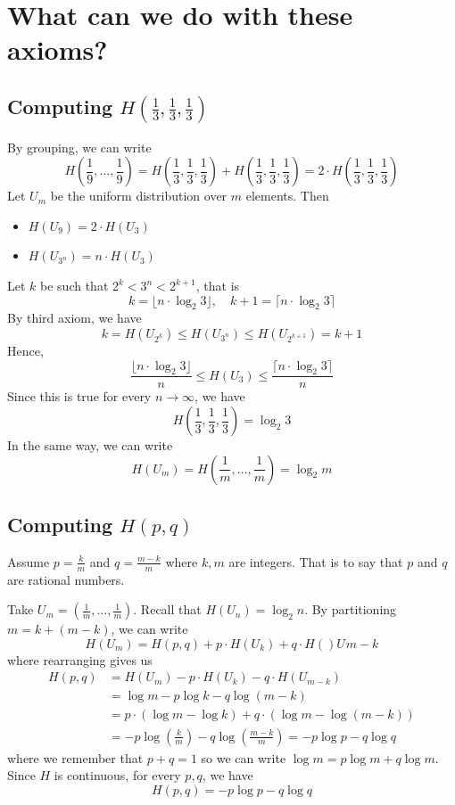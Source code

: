 \documentclass{article}
\begin{document}
\section{What can we do with these axioms?}

\subsection{Computing $H\left(\frac{1}{3},\frac{1}{3},\frac{1}{3}\right)$}

By grouping, we can write 
\[
H\left(\frac{1}{9},\ldots,\frac{1}{9}\right)=H\left(\frac{1}{3},\frac{1}{3},\frac{1}{3}\right)+H\left(\frac{1}{3},\frac{1}{3},\frac{1}{3}\right)=2\cdot H\left(\frac{1}{3},\frac{1}{3},\frac{1}{3}\right)
\]
Let $U_m$ be the uniform distribution over $m$ elements. Then 
\begin{itemize}
    \item $H\left(U_9\right)=2\cdot H\left(U_3\right)$
    \item $H\left(U_{3^n}\right)=n\cdot H\left(U_3\right)$
\end{itemize}
Let $k$ be such that $2^k< 3^n < 2^{k+1}$, that is 
\[
k=\lfloor n\cdot \log_2 3 \rfloor,\quad k+1 = \lceil n\cdot \log_2 3\rceil 
\]
By third axiom, we have 
\[
k=H(U_{2^k})\leq H(U_{3^n})\leq H(U_{2^{k+1}})=k+1
\]
Hence,
\[
\frac{\lfloor n\cdot \log_2 3 \rfloor}{n}\leq H\left(U_3\right) \leq \frac{\lceil n\cdot \log_2 3\rceil }{n}
\]
Since this is true for every $n\to\infty$, we have 
\[
H\left(\frac{1}{3},\frac{1}{3},\frac{1}{3}\right)=\log_2 3
\]
In the same way, we can write 
\[
H(U_m) = H\left(\frac{1}{m},\ldots,\frac{1}{m}\right) = \log_2 m
\]

\subsection{Computing $H\left(p,q\right)$}

Assume $p=\frac{k}{m}$ and $q=\frac{m-k}{m}$ where $k,m$ are integers. That is to say that $p$ and $q$ are rational numbers.

Take $U_m=\left(\frac{1}{m},\ldots,\frac{1}{m}\right)$. Recall that $H(U_n)=\log_2 n$. By partitioning $m=k+(m-k)$, we can write 
\[
H(U_m)= H(p,q) + p\cdot H(U_k) + q\cdot H()U_{}m-k
\]
where rearranging gives us 
\begin{align*}
    H(p,q) &= H(U_m)- p\cdot H(U_k) - q\cdot H(U_{m-k})\\
    &= \log m -p\log k - q\log \left(m-k\right)\\
    &= p\cdot \left(\log m - \log k \right) + q\cdot \left(\log m - \log \left(m-k\right)\right)\\
    &= -p\log\left(\frac{k }{m }\right) - q\log\left(\frac{m-k }{m}\right)= -p\log p - q \log q
\end{align*} 
where we remember that $p+q=1$ so we can write $\log m = p\log m + q \log m$. Since $H$ is continuous, for every $p,q$, we have 
\[
H(p,q) = -p\log p -q\log q
\]
\end{document}

